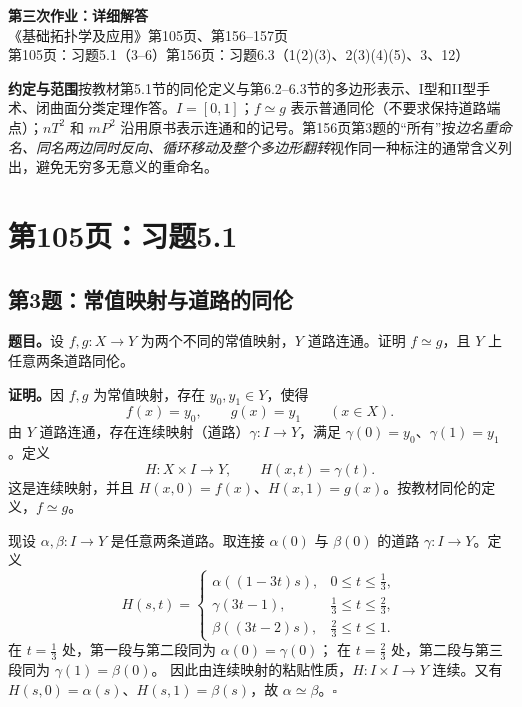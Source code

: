 \documentclass[UTF8,11pt,a4paper]{ctexart}
\begin{document}
\begin{center}
{\fontsize{22}{28}\selectfont\bfseries 第三次作业：详细解答}\\[8pt]
{\large 《基础拓扑学及应用》\quad 第105页、第156--157页}\\[5pt]
\small 第105页：习题5.1（3--6）\qquad 第156页：习题6.3（1(2)(3)、2(3)(4)(5)、3、12）
\end{center}
\vspace{3mm}
\noindent\colorbox{accent!7}{\parbox{\dimexpr\textwidth-2\fboxsep}{\small
\textbf{约定与范围}\quad 按教材第5.1节的同伦定义与第6.2--6.3节的多边形表示、I型和II型手术、闭曲面分类定理作答。\(I=[0,1]\)；\(f\simeq g\) 表示普通同伦（不要求保持道路端点）；\(nT^2\) 和 \(mP^2\) 沿用原书表示连通和的记号。第156页第3题的“所有”按\emph{边名重命名、同名两边同时反向、循环移动及整个多边形翻转}视作同一种标注的通常含义列出，避免无穷多无意义的重命名。}}

\section{第105页：习题5.1}

\subsection*{第3题：常值映射与道路的同伦}
\textbf{题目。}\;设 \(f,g:X\to Y\) 为两个不同的常值映射，\(Y\) 道路连通。证明 \(f\simeq g\)，且 \(Y\) 上任意两条道路同伦。

\textbf{证明。}\;因 \(f,g\) 为常值映射，存在 \(y_0,y_1\in Y\)，使得
\[
 f(x)=y_0,\qquad g(x)=y_1\qquad(x\in X).
\]
由 \(Y\) 道路连通，存在连续映射（道路）\(\gamma:I\to Y\)，满足
\(\gamma(0)=y_0\)、\(\gamma(1)=y_1\)。定义
\[
 H:X\times I\to Y,\qquad H(x,t)=\gamma(t).
\]
这是连续映射，并且 \(H(x,0)=f(x)\)、\(H(x,1)=g(x)\)。按教材同伦的定义，\(f\simeq g\)。

现设 \(\alpha,\beta:I\to Y\) 是任意两条道路。取连接 \(\alpha(0)\) 与 \(\beta(0)\) 的道路 \(\gamma:I\to Y\)。定义
\[
 H(s,t)=
 \begin{cases}
 \alpha((1-3t)s),&0\le t\le \frac13,\\[2pt]
 \gamma(3t-1),&\frac13\le t\le\frac23,\\[2pt]
 \beta((3t-2)s),&\frac23\le t\le1.
 \end{cases}
\]
在 \(t=\frac13\) 处，第一段与第二段同为 \(\alpha(0)=\gamma(0)\)；
在 \(t=\frac23\) 处，第二段与第三段同为 \(\gamma(1)=\beta(0)\)。
因此由连续映射的粘贴性质，\(H:I\times I\to Y\) 连续。又有
\(H(s,0)=\alpha(s)\)、\(H(s,1)=\beta(s)\)，故 \(\alpha\simeq\beta\)。\hfill\(\square\)
\end{document}
